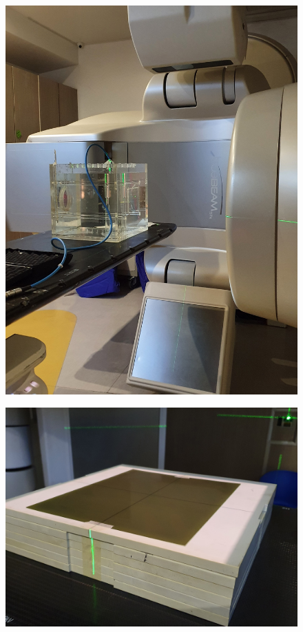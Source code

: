 \documentclass[12pt]{beamer}
\begin{document}
\begin{frame}
\begin{figure}
	\centering
	\includegraphics[width=\linewidth]{images/20200826_205548.jpg}
\end{figure}
\end{frame}

\begin{frame}
\begin{figure}
	\centering
	\includegraphics[width=\linewidth]{images/20200826_215214.jpg}
\end{figure}
\end{frame}
\end{document}
